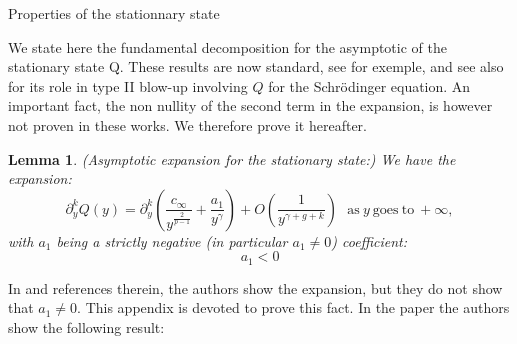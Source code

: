 \documentclass[11pt,a4paper,reqno]{amsart}
\newtheorem{lemma}[theorem]{Lemma}
\theoremstyle{remark}
\numberwithin{equation}{section}
\begin{document}
\begin{appendix}

{  \z@{1.5\linespacing\@plus\linespacing}{.5\linespacing}  {\normalfont\bfseries\large\centering}}{Properties of the stationnary state}

We state here the fundamental decomposition for the asymptotic of the stationary state Q. These results are now standard, see \cite{YiLi} \cite{GNW} for exemple, and see also \cite{MRRod2} for its role in type II blow-up involving $Q$ for the Schr\"odinger equation. An important fact, the non nullity of the second term in the expansion, is however not proven in these works. We therefore prove it hereafter.

\begin{lemma}\label{lem:expansion_soliton}
(\emph{Asymptotic expansion for the stationary state:})
We have the expansion:
\begin{equation}
\partial_y^k Q(y)=\partial_y^k\left( \frac{c_{\infty}}{y^{\frac{2}{p-1}}}+\frac{a_1}{y^{\gamma}}\right)+O\left( \frac{1}{y^{\gamma+g+k}} \right) \ \ \ \text{as} \ y \ \text{goes} \ \text{to} \ +\infty ,
\end{equation}
with $a_1$ being a strictly negative (in particular $a_1\neq 0$) coefficient:
\begin{equation} \label{annexe:eq:a1 strict negatif}
a_1<0
\end{equation}
\end{lemma}

In \cite{GNW} and references therein, the authors show the expansion, but they do not show that $a_1\neq 0$. This appendix is devoted to prove this fact. In the paper the authors show the following result:


\end{appendix}
\end{document}
